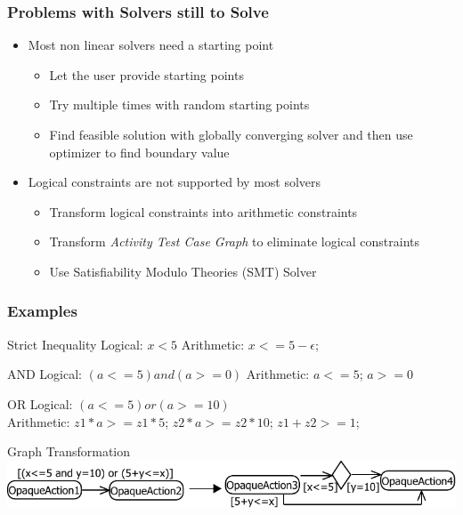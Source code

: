 \documentclass{beamer}
\begin{document}
\begin{frame}
\frametitle{Problems with Solvers still to Solve}
\begin{itemize}
\item Most non linear solvers need a starting point
\begin{itemize}
\item Let the user provide starting points
\item Try multiple times with random starting points
\item Find feasible solution with globally converging solver and then use optimizer to find boundary value
\end{itemize}
\item Logical constraints are not supported by most solvers
\begin{itemize}
\item Transform logical constraints into arithmetic constraints
\item Transform \emph{Activity Test Case Graph} to eliminate logical constraints
\item Use Satisfiability Modulo Theories (SMT) Solver
\end{itemize}
\end{itemize}
\end{frame}

\begin{frame}
\frametitle{Examples}
\begin{block}{Strict Inequality}
Logical: $x<5$ \hspace{1cm} Arithmetic: $x<=5-\epsilon$;
\end{block}
\begin{block}{AND}
Logical: $(a<=5) and (a>=0)$ \hspace{1cm} Arithmetic: $a<=5$; $a>=0$
\end{block}
\begin{block}{OR}
Logical: $(a<=5) or (a>=10)$ \\Arithmetic: $z1*a>=z1*5$; $ z2*a>=z2*10$; $z1+z2>=1$;
\end{block}
\begin{block}{Graph Transformation}
\includegraphics[width=\textwidth]{../pics/transformLocigGuards.pdf}
\end{block}
\end{frame}
\end{document}
